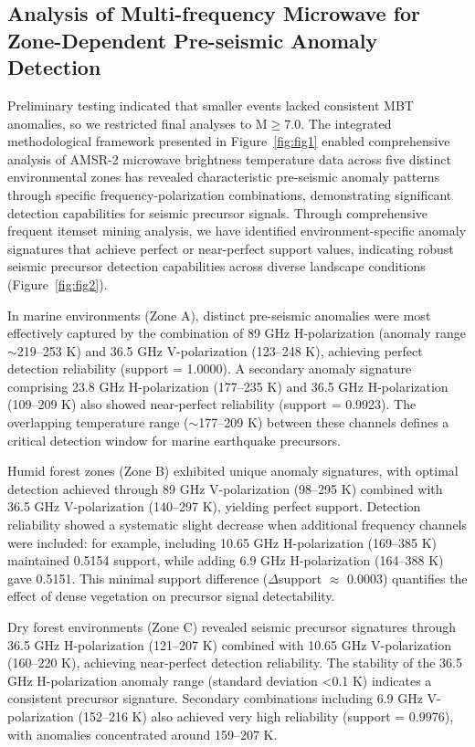 \documentclass[fleqn,10pt]{wlscirep_mdpi_style}
\begin{document}
\subsection{Analysis of Multi-frequency Microwave for Zone-Dependent Pre-seismic Anomaly Detection}
Preliminary testing indicated that smaller events lacked consistent MBT anomalies, so we restricted final analyses to M$\ge$7.0. The integrated methodological framework presented in Figure~\ref{fig:fig1} enabled comprehensive analysis of AMSR-2 microwave brightness temperature data across five distinct environmental zones has revealed characteristic pre-seismic anomaly patterns through specific frequency-polarization combinations, demonstrating significant detection capabilities for seismic precursor signals. Through comprehensive frequent itemset mining analysis, we have identified environment-specific anomaly signatures that achieve perfect or near-perfect support values, indicating robust seismic precursor detection capabilities across diverse landscape conditions (Figure~\ref{fig:fig2}).

In marine environments (Zone A), distinct pre-seismic anomalies were most effectively captured by the combination of 89 GHz H-polarization (anomaly range $\sim$219–253 K) and 36.5 GHz V-polarization (123–248 K), achieving perfect detection reliability (support = 1.0000). A secondary anomaly signature comprising 23.8 GHz H-polarization (177–235 K) and 36.5 GHz H-polarization (109–209 K) also showed near-perfect reliability (support = 0.9923). The overlapping temperature range ($\sim$177–209 K) between these channels defines a critical detection window for marine earthquake precursors.

Humid forest zones (Zone B) exhibited unique anomaly signatures, with optimal detection achieved through 89 GHz V-polarization (98–295 K) combined with 36.5 GHz V-polarization (140–297 K), yielding perfect support. Detection reliability showed a systematic slight decrease when additional frequency channels were included: for example, including 10.65 GHz H-polarization (169–385 K) maintained 0.5154 support, while adding 6.9 GHz H-polarization (164–388 K) gave 0.5151. This minimal support difference ($\Delta$support $\approx$ 0.0003) quantifies the effect of dense vegetation on precursor signal detectability.

Dry forest environments (Zone C) revealed seismic precursor signatures through 36.5 GHz H-polarization (121–207 K) combined with 10.65 GHz V-polarization (160–220 K), achieving near-perfect detection reliability. The stability of the 36.5 GHz H-polarization anomaly range (standard deviation <0.1 K) indicates a consistent precursor signature. Secondary combinations including 6.9 GHz V-polarization (152–216 K) also achieved very high reliability (support = 0.9976), with anomalies concentrated around 159–207 K.
\end{document}
